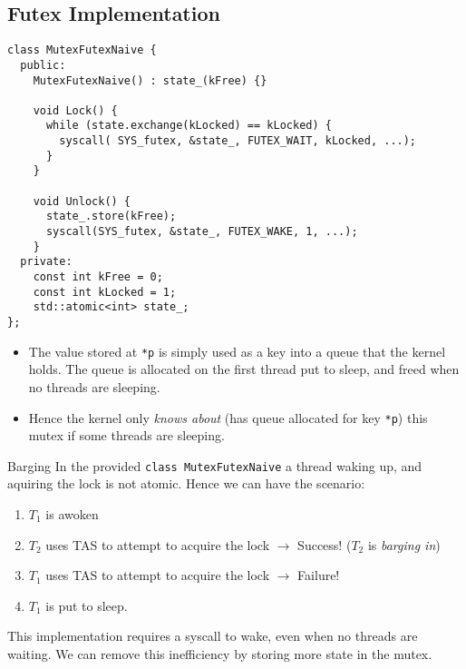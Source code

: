 \subsection{Futex Implementation}
\begin{verbatim}
class MutexFutexNaive {
  public:
    MutexFutexNaive() : state_(kFree) {}

    void Lock() {
      while (state.exchange(kLocked) == kLocked) {
        syscall( SYS_futex, &state_, FUTEX_WAIT, kLocked, ...);
      }
    }

    void Unlock() {
      state_.store(kFree);
      syscall(SYS_futex, &state_, FUTEX_WAKE, 1, ...);
    }
  private:
    const int kFree = 0;
    const int kLocked = 1;
    std::atomic<int> state_;
};
\end{verbatim}
\begin{itemize}
	\item The value stored at \texttt{*p} is simply used as a key into a queue that the kernel holds. The queue is allocated on the first thread put to sleep, and freed when no threads are sleeping.
	\item Hence the kernel only \textit{knows about} (has queue allocated for key \texttt{*p}) this mutex if some threads are sleeping.
\end{itemize}
\begin{definitionbox}{Barging}
	In the provided \texttt{class MutexFutexNaive} a thread waking up, and aquiring the lock is not atomic. Hence we can have the scenario:
	\begin{enumerate}
		\item $T_1$ is awoken
		\item $T_2$ uses TAS to attempt to acquire the lock $\to$ Success! ($T_2$ is \textit{barging in})
		\item $T_1$ uses TAS to attempt to acquire the lock $\to$ Failure!
		\item $T_1$ is put to sleep.
	\end{enumerate}
\end{definitionbox}
This implementation requires a syscall to wake, even when no threads are waiting. We can remove this inefficiency by storing more state in the mutex.
